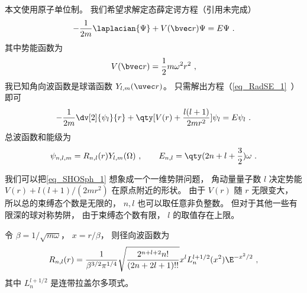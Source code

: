 
\begin{issues}
\issueDraft
\end{issues}


本文使用原子单位制。 我们希望求解定态薛定谔方程（引用未完成）
\begin{equation}
-\frac{1}{2m} \laplacian {\Psi} + V(\bvec r)\Psi = E \Psi~.
\end{equation}
其中势能函数为
\begin{equation}
V(\bvec r) = \frac{1}{2}m\omega^2 r^2~,
\end{equation}
我已知角向波函数是球谐函数 $Y_{l,m}(\uvec r)$。 只需解出方程（\autoref{eq_RadSE_1}~）即可
\begin{equation}\label{eq_SHOSph_1}
-\frac{1}{2m} \dv[2]{\psi_l}{r} + \qty[V(r) + \frac{l(l + 1)}{2mr^2}]\psi_l = E\psi_l~.
\end{equation}
总波函数和能级为
\begin{equation}
\psi_{n,l,m} = R_{n,l}(r) Y_{l,m}(\Omega)~,
\qquad
E_{n,l} = \qty(2n + l + \frac32) \omega~.
\end{equation}    

我们可以把\autoref{eq_SHOSph_1} 想象成一个一维势阱问题， 角动量量子数 $l$ 决定势能 $V(r) + l(l + 1)/(2mr^2)$ 在原点附近的形状。 由于 $V(r)$ 随 $r$ 无限变大， 所以总的束缚态个数是无限的， $n, l$ 也可以取任意非负整数。 但对于其他一些有限深的球对称势阱， 由于束缚态个数有限， $l$ 的取值存在上限。

令 $\beta = 1/\sqrt{m\omega}$， $x = r/\beta$， 则径向波函数为
\begin{equation}
R_{n,l}(r) = \frac{1}{\beta^{3/2} \pi^{1/4}} \sqrt{\frac{2^{n+l+2} n!}{(2n + 2l + 1)!!}} x^l L_n^{l+1/2}(x^2) \E^{-x^2/2}~,
\end{equation}
其中 $L_n^{l+1/2}$ 是连带拉盖尔多项式。

